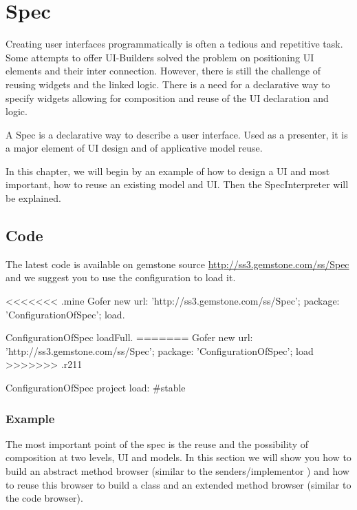 \documentclass[a4paper,10pt,twoside]{book}
\begin{document}
\fi
\sloppy

\chapter{Spec}

Creating user interfaces programmatically is often a tedious and repetitive task. Some attempts to offer UI-Builders solved the problem on positioning UI elements and their inter connection. However, there is still the challenge of reusing widgets and the linked logic. There is a need for a declarative way to specify widgets allowing for composition and reuse of the UI declaration and logic. 

A Spec is a declarative way to describe a user interface. Used as a presenter, it is a major element of UI design and of applicative model reuse.

In this chapter, we will begin by an example of how to design a UI and most important, how to reuse an existing model and UI. Then the SpecInterpreter will be explained.

\section{Code}

The latest code is available on gemstone source \url{http://ss3.gemstone.com/ss/Spec} and we suggest you to use the configuration to load it.

\begin{code}{}
<<<<<<< .mine
Gofer new
	url: 'http://ss3.gemstone.com/ss/Spec';
	package: 'ConfigurationOfSpec';
	load.
	
ConfigurationOfSpec loadFull.	
=======
Gofer new
	url: 'http://ss3.gemstone.com/ss/Spec';
	package: 'ConfigurationOfSpec';
	load
>>>>>>> .r211
	
ConfigurationOfSpec project load: #stable
\end{code}

\subsection{Example}

The most important point of the spec is the reuse and the possibility of composition at two levels, UI and models. In this section we will show you how to build an abstract method browser (similar to the senders/implementor ) and how to reuse this browser to build a class and an extended method browser (similar to the code browser).
\end{document}
